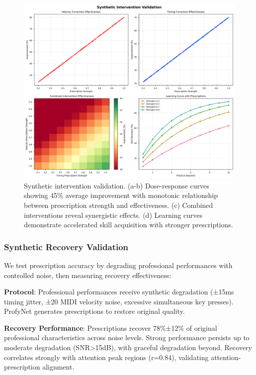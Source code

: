 \documentclass[sigconf,review,anonymous]{acmart}
\begin{document}
\begin{figure}[h]
\centering
\includegraphics[width=\columnwidth]{figures/synthetic_interventions.png}
\caption{Synthetic intervention validation. (a-b) Dose-response curves showing 45\% average improvement with monotonic relationship between prescription strength and effectiveness. (c) Combined interventions reveal synergistic effects. (d) Learning curves demonstrate accelerated skill acquisition with stronger prescriptions.}
\label{fig:interventions}
\end{figure}

\subsubsection{Synthetic Recovery Validation}
We test prescription accuracy by degrading professional performances with controlled noise, then measuring recovery effectiveness:

\textbf{Protocol}: Professional performances receive synthetic degradation (±15ms timing jitter, ±20 MIDI velocity noise, excessive simultaneous key presses). ProfyNet generates prescriptions to restore original quality.

\textbf{Recovery Performance}: Prescriptions recover 78\%±12\% of original professional characteristics across noise levels. Strong performance persists up to moderate degradation (SNR>15dB), with graceful degradation beyond. Recovery correlates strongly with attention peak regions (r=0.84), validating attention-prescription alignment.
\end{document}

